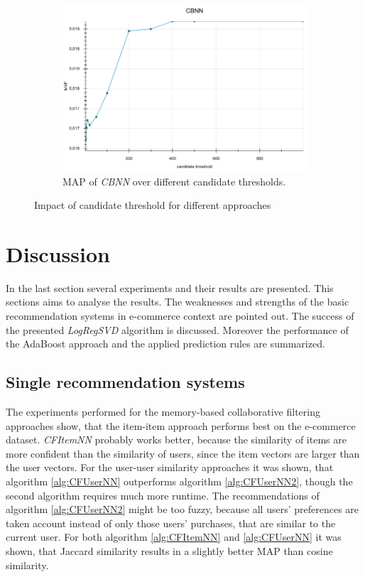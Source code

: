 \documentclass[10pt]{reportMaster}
\begin{document}
\begin{figure}
\begin{subfigure}[c]{0.5\textwidth}
		\includegraphics[width=1\textwidth]{figures/experiments/CBNNCandidates}
		\caption{MAP of \textit{CBNN} over different candidate thresholds.}
		\label{fig:CBNNCandidates}
	\end{subfigure}
	\caption{Impact of candidate threshold for different approaches}
	\label{fig:candidates}
\end{figure}


\section{Discussion}
\label{sec:discussion}
In the last section several experiments and their results are presented.
This sections aims to analyse the results.
The weaknesses and strengths of the basic recommendation systems in e-commerce context are pointed out.
The success of the presented \textit{LogRegSVD} algorithm is discussed.
Moreover the performance of the AdaBoost approach and the applied prediction rules are summarized.

\subsection{Single recommendation systems}
\label{sec:discSingleRecommendationSystems}
The experiments performed for the memory-based collaborative filtering approaches show, that the item-item approach performs best on the e-commerce dataset.
\textit{CFItemNN} probably works better, because the similarity of items are more confident than the similarity of users, since the item vectors are larger than the user vectors.
For the user-user similarity approaches it was shown, that algorithm \ref{alg:CFUserNN} outperforms algorithm \ref{alg:CFUserNN2}, though the second algorithm requires much more runtime.
The recommendations of algorithm \ref{alg:CFUserNN2} might be too fuzzy, because all users' preferences are taken account instead of only those users' purchases, that are similar to the current user.
For both algorithm \ref{alg:CFItemNN} and \ref{alg:CFUserNN} it was shown, that Jaccard similarity results in a slightly better MAP than cosine similarity.
\end{document}

